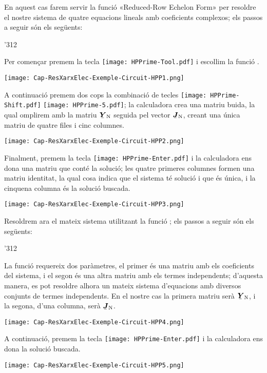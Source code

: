 \begin{exemple}
    En aquest cas farem servir la funció  «Reduced-Row Echelon Form» per resoldre el nostre sistema de quatre equacions lineals amb coeficients complexos; els passos a seguir són els següents:

    \begin{dingautolist}{'312}
         \item Per començar premem la tecla \texttt{[image: HPPrime-Tool.pdf]} i escollim la funció .

             \texttt{[image: Cap-ResXarxElec-Exemple-Circuit-HPP1.png]}
         \item A continuació premem dos cops la combinació de tecles  \texttt{[image: HPPrime-Shift.pdf]} \texttt{[image: HPPrime-5.pdf]}; la calculadora crea una matriu buida, la qual omplirem amb la matriu $\mcmplx{Y}\ped{N}$ seguida pel vector $\mcmplx{J}\ped{N}$, creant una única matriu de quatre files i cinc columnes.

             \texttt{[image: Cap-ResXarxElec-Exemple-Circuit-HPP2.png]}

         \item Finalment, premem la tecla \texttt{[image: HPPrime-Enter.pdf]} i la calculadora ens dona una matriu que conté la solució; les quatre primeres columnes formen una matriu identitat, la qual cosa indica que el sistema té solució i que és única, i la cinquena columna és la  solució buscada.

         \texttt{[image: Cap-ResXarxElec-Exemple-Circuit-HPP3.png]}
    \end{dingautolist}

    Resoldrem ara el mateix sistema utilitzant  la funció ; els passos a seguir són els següents:

    \begin{dingautolist}{'312}
         \item La funció  requereix dos paràmetres, el primer és una matriu amb els coeficients del sistema, i el segon és una altra matriu amb els termes independents; d'aquesta manera, es pot resoldre alhora un mateix sistema d'equacions amb diversos conjunts de termes independents. En el nostre cas la primera matriu serà $\mcmplx{Y}\ped{N}$, i la segona, d'una columna, serà  $\mcmplx{J}\ped{N}$.

             \texttt{[image: Cap-ResXarxElec-Exemple-Circuit-HPP4.png]}

         \item A continuació, premem la tecla \texttt{[image: HPPrime-Enter.pdf]} i la calculadora ens dona la  solució buscada.

         \texttt{[image: Cap-ResXarxElec-Exemple-Circuit-HPP5.png]}
    \end{dingautolist}
\end{exemple}


